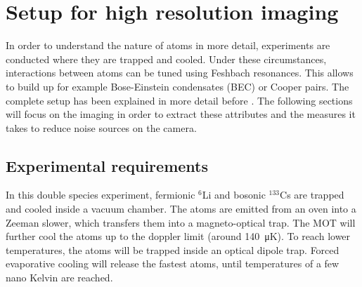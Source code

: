 \chapter{Setup for high resolution imaging}

In order to understand the nature of atoms in more detail, experiments are conducted where they are trapped and cooled. Under these circumstances, interactions between atoms can be tuned using Feshbach resonances. This allows to build up for example Bose-Einstein condensates (BEC) or Cooper pairs. The complete setup has been explained in more detail before \cite{Repp2013a}. The following sections will focus on the imaging in order to extract these attributes and the measures it takes to reduce noise sources on the camera.

\section{Experimental requirements}
In this double species experiment, fermionic $^6$Li and bosonic $^{133}$Cs are trapped and cooled inside a vacuum chamber. The atoms are emitted from an oven into a Zeeman slower, which transfers them into a magneto-optical trap. The MOT will further cool the atoms up to the doppler limit (around \SI{140}{\micro\kelvin}). To reach lower temperatures, the atoms will be trapped inside an optical dipole trap. Forced evaporative cooling will release the fastest atoms, until temperatures of a few nano Kelvin are reached.


